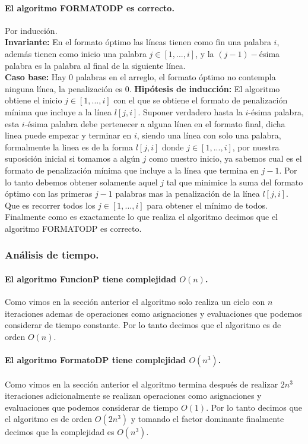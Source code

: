 \documentclass[12pt]{article}
\begin{document}
	\paragraph{El algoritmo FORMATODP es correcto.}
	Por inducción.\\
	\textbf{Invariante:} En el formato óptimo las líneas tienen como fin una palabra $i$, además tienen como inicio una palabra $j\in[1,...,i]$, y la $(j-1)-$ésima palabra es la palabra al final de la siguiente línea.\\
	\textbf{Caso base:} Hay 0 palabras en el arreglo, el formato óptimo no contempla ninguna línea, la penalización es 0.
	\textbf{Hipótesis de inducción:} El algoritmo obtiene el inicio $j\in[1,...,i]$ con el que se obtiene el formato de penalización mínima que incluye a la línea $l[j,i]$.
	Suponer verdadero hasta la $i$-ésima palabra, esta $i$-ésima palabra debe pertenecer a alguna línea en el formato final, dicha linea puede empezar y terminar en $i$, siendo una línea con solo una palabra, formalmente la linea es de la forma $l[j,i]$ donde $j\in[1,...,i]$, por nuestra suposición inicial si tomamos a algún $j$ como nuestro inicio, ya sabemos cual es el formato de penalización mínima que incluye a la línea que termina en $j-1$. Por lo tanto debemos obtener solamente aquel $j$ tal que minimice la suma del formato óptimo con las primeras $j-1$ palabras mas la penalización de la línea $l[j,i]$. Que es recorrer todos los $j\in[1,...,i]$ para obtener el mínimo de todos. Finalmente como es exactamente lo que realiza el algoritmo decimos que el algoritmo FORMATODP es correcto.
	\subsubsection{Análisis de tiempo.}
	\paragraph{El algoritmo FuncionP tiene complejidad $O(n)$.} Como vimos en la sección anterior el algoritmo solo realiza un ciclo con $n$ iteraciones ademas de operaciones como asignaciones y evaluaciones que podemos considerar de tiempo constante. Por lo tanto decimos que el algoritmo es de orden $O(n)$.
	\paragraph{El algoritmo FormatoDP tiene complejidad $O(n^3)$.} Como vimos en la sección anterior el algoritmo termina después de realizar $2n^3$ iteraciones adicionalmente se realizan operaciones como asignaciones y evaluaciones que podemos considerar de tiempo $O(1)$. Por lo tanto decimos que el algoritmo es de orden $O(2n^3)$ y tomando el factor dominante finalmente decimos que la complejidad es $O(n^3)$.
\end{document}
